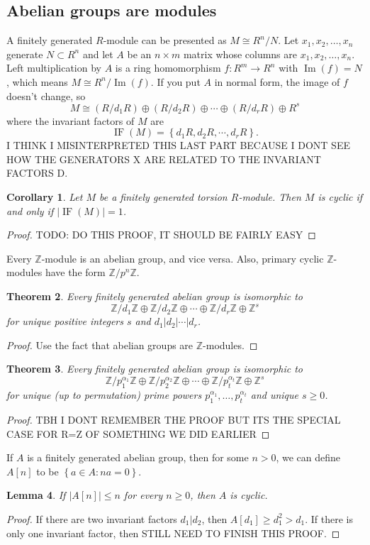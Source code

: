 \documentclass[12pt]{article}
\newtheorem{thm}{Theorem}[section]
\newtheorem{cor}[thm]{Corollary}
\newtheorem{lem}[thm]{Lemma}
\begin{document}
\subsection{Abelian groups are modules}
A finitely generated $R$-module can be presented as $M \cong R^n/N$. Let $x_1, x_2, \dots, x_n$ generate $N \subset R^n$ and let $A$ be an $n \times m$ matrix whose columns are $x_1, x_2, \dots, x_n$. Left multiplication by $A$ is a ring homomorphism $f: R^m \rightarrow R^n$ with $ \operatorname{Im}(f)=N$, which means $M \cong R^n/ \operatorname{Im}(f)$. If you put $A$ in normal form, the image of $f$ doesn't change, so
\[ M \cong (R/d_1R) \oplus (R/d_2R) \oplus \cdots \oplus (R/d_rR) \oplus R^s \]
where the invariant factors of $M$ are
\[ \operatorname{IF}(M) = \left\{ d_1R, d_2R, \cdots, d_rR \right\}. \]
I THINK I MISINTERPRETED THIS LAST PART BECAUSE I DONT SEE HOW THE GENERATORS X ARE RELATED TO THE INVARIANT FACTORS D.
\begin{cor}\label{cyclicmodule}
    Let $M$ be a finitely generated torsion $R$-module. Then $M$ is cyclic if and only if $| \operatorname{IF}(M)|=1$.
\end{cor}
\begin{proof}
    TODO: DO THIS PROOF, IT SHOULD BE FAIRLY EASY
\end{proof}
\par
Every $\mathbb{Z}$-module is an abelian group, and vice versa. Also, primary cyclic $\mathbb{Z}$-modules have the form $\mathbb{Z}/p^n\mathbb{Z}$.
\begin{thm}\label{abeliangrouptorsion}
    Every finitely generated abelian group is isomorphic to
    \[ \mathbb{Z}/d_1\mathbb{Z} \oplus \mathbb{Z}/d_2\mathbb{Z} \oplus \cdots \oplus \mathbb{Z}/d_r\mathbb{Z} \oplus \mathbb{Z}^s \]
    for unique positive integers $s$ and $d_1|d_2|\cdots|d_r$.
\end{thm}
\begin{proof}
    Use the fact that abelian groups are $\mathbb{Z}$-modules.
\end{proof}
\begin{thm}\label{primepowerabeliangroups}
    Every finitely generated abelian group is isomorphic to
    \[ \mathbb{Z}/p_1^{\alpha_1}\mathbb{Z} \oplus \mathbb{Z}/p_2^{\alpha_2}\mathbb{Z} \oplus \cdots \oplus \mathbb{Z}/p_t^{\alpha_t}\mathbb{Z} \oplus \mathbb{Z}^s \]
    for unique (up to permutation) prime powers $p_1^{\alpha_1}, \dots, p_t^{\alpha_t}$ and unique $s \geq 0$.
\end{thm}
\begin{proof}
    TBH I DONT REMEMBER THE PROOF BUT ITS THE SPECIAL CASE FOR R=Z OF SOMETHING WE DID EARLIER
\end{proof}
If $A$ is a finitely generated abelian group, then for some $n>0$, we can define $A[n]$ to be $ \left\{ a \in A:na=0 \right\}$.
\begin{lem}\label{cycliciffthereisoneinvariantfactor}
    If $|A[n]|\leq n$ for every $n \geq 0$, then $A$ is cyclic.
\end{lem}
\begin{proof}
    If there are two invariant factors $d_1|d_2$, then $A[d_1] \geq d_1^2 > d_1$. If there is only one invariant factor, then STILL NEED TO FINISH THIS PROOF.
\end{proof}
\end{document}
